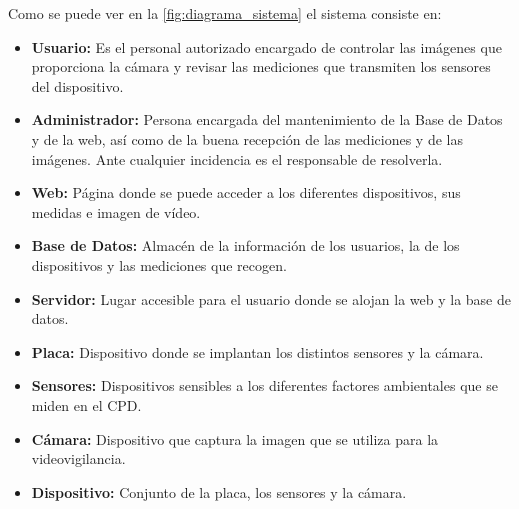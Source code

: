 \begin{figure}[H]
{}
\end{figure}

Como se puede ver en la \autoref{fig:diagrama_sistema} el sistema consiste en:
\begin{itemize}
	\item \textbf{Usuario:} Es el personal autorizado encargado de controlar las imágenes que proporciona la cámara y revisar las mediciones que transmiten los sensores del dispositivo.
	\item \textbf{Administrador:} Persona encargada del mantenimiento de la Base de Datos y de la web, así como de la buena recepción de las mediciones y de las imágenes. Ante cualquier incidencia es el responsable de resolverla.
	\item \textbf{Web:} Página donde se puede acceder a los diferentes dispositivos, sus medidas e imagen de vídeo.
	\item \textbf{Base de Datos:} Almacén de la información de los usuarios, la de los dispositivos y las mediciones que recogen.
	\item \textbf{Servidor:} Lugar accesible para el usuario donde se alojan la web y la base de datos.
	\item \textbf{Placa:} Dispositivo donde se implantan los distintos sensores y la cámara.
	\item \textbf{Sensores:} Dispositivos sensibles a los diferentes factores ambientales que se miden en el CPD\@.
	\item \textbf{Cámara:} Dispositivo que captura la imagen que se utiliza para la videovigilancia.
	\item \textbf{Dispositivo:} Conjunto de la placa, los sensores y la cámara.
\end{itemize}

